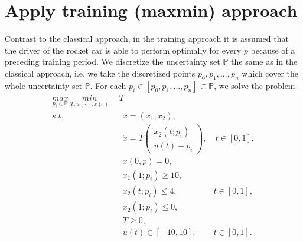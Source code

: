 \documentclass  [
  paper    = a4,
  BCOR     = 10mm,
  twoside,
  fontsize = 12pt,
  fleqn,
  toc      = bibnumbered,
  toc      = listofnumbered,
  numbers  = noendperiod,
  headings = normal,
  listof   = leveldown,
  version  = 3.03
]                                       {scrreprt}
\newcommand{\<}{\langle}
\renewcommand{\>}{\rangle}
\begin{document}


\section{Apply training (maxmin) approach}
Contrast to the classical approach, in the training approach it is assumed that the driver of the rocket car is able to perform optimally for every $p$ because of a preceding training period. We discretize the uncertainty set $\mathbb{P}$ the same as in the classical approach, i.e. we take the discretized points $p_0, p_1, ..., p_n$ which cover the whole uncertainty set $\mathbb{P}$.  For each $ p_i  \in [p_0, p_1, ..., p_n] \subset \mathbb{P}$, we solve the problem 
\begin{subequations}
	\begin{align}
		 \underset{p_i \in \mathbb{P}}{max}  \ \underset{T, u(\cdot), x(\cdot)}{min}  \ \   &   T  \\ 
		s.t.  & \ \ x = (x_1, x_2),   \label{ta_rc_x} \\ 
		& \ \  \dot{x} = T  \begin{pmatrix}  x_2(t;p_i) \\ u(t)-p_i   \end{pmatrix}, & \ t \in [0,1],  \label{ta_rc_partial} \\
		& \ \ x(0,p) = 0, \label{ta_rc_t0}\\
		& \ \ x_1(1;p_i) \geq 10, \label{ta_rc_x1_t1} \\
		& \ \ x_2(t;p_i) \leq 4, & t \in [0,1], \label{ta_rc_x2_tc} \\
		& \ \ x_2(1;p_i) \leq 0, \label{ta_rc_x2_t1}  \\
		& \ \ T \geq 0, \\
		& \ \ u(t) \in [-10, 10], & t \in [0,1]. 
	\end{align}
	\label{TA_rc}
\end{subequations}
\end{document}
